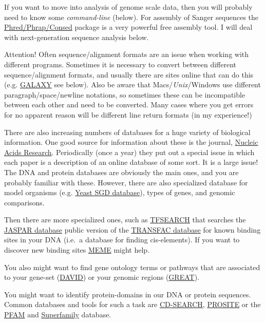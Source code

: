 \documentclass[]{article}
\begin{document}
If you want to move into analysis of genome scale data, then you will
probably need to know some \emph{command-line} (below). For assembly of
Sanger sequences the
\href{http://www.phrap.org/phredphrapconsed.html}{Phred/Phrap/Consed}
package is a very powerful free assembly tool. I will deal with
next-generation sequence analysis below.

Attention! Often sequence/alignment formats are an issue when working
with different programs. Sometimes it is necessary to convert between
different sequence/alignment formats, and usually there are sites online
that can do this (e.g. \href{https://usegalaxy.org/}{GALAXY} see below).
Also be aware that Macs/\emph{Unix}/Windows use different
paragraph/space/newline notations, so sometimes these can be
incompatible between each other and need to be converted. Many cases
where you get errors for no apparent reason will be different line
return formats (in my experience!)

There are also increasing numbers of databases for a huge variety of
biological information. One good source for information about these is
the journal, \href{http://nar.oxfordjournals.org/}{Nucleic Acids
Research}. Periodically (once a year) they put out a special issue in
which each paper is a description of an online database of some sort. It
is a large issue! The DNA and protein databases are obviously the main
ones, and you are probably familiar with these. However, there are also
specialized database for model organisms (e.g.
\href{http://www.yeastgenome.org/}{Yeast SGD database}), types of genes,
and genomic comparisons.

Then there are more specialized ones, such as
\href{http://www.cbrc.jp/research/db/TFSEARCH.html}{TFSEARCH} that
searches the \href{http://jaspar.genereg.net/}{JASPAR database} public
version of the
\href{http://www.gene-regulation.com/pub/databases.html}{TRANSFAC
database} for known binding sites in your DNA (i.e.~a database for
finding cis-elements). If you want to discover new binding sites
\href{http://meme.nbcr.net/meme/}{MEME} might help.

You also might want to find gene ontology terms or pathways that are
associated to your gene-set
(\href{http://david.abcc.ncifcrf.gov/}{DAVID}) or your genomic regions
(\href{http://bejerano.stanford.edu/great/public/html/}{GREAT}).

You might want to identify protein-domains in our DNA or protein
sequences. Common databases and tools for such a task are
\href{http://www.ncbi.nlm.nih.gov/Structure/bwrpsb/bwrpsb.cgi?}{CD-SEARCH},
\href{http://prosite.expasy.org/}{PROSITE} or the
\href{http://pfam.xfam.org/}{PFAM} and
\href{http://supfam.org/SUPERFAMILY/hmm.html}{Superfamily} database.
\end{document}
